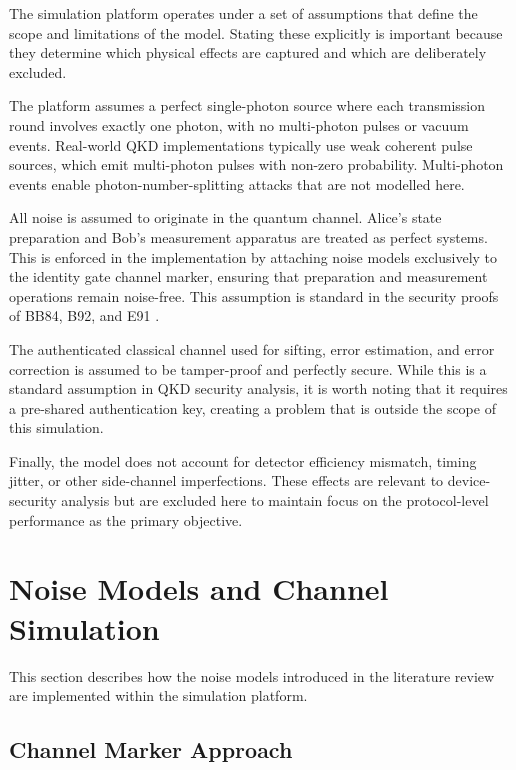 The simulation platform operates under a set of assumptions that define the scope and limitations of the model. Stating these explicitly is important because they determine which physical effects are captured and which are deliberately excluded.

The platform assumes a perfect single-photon source where each transmission round involves exactly one photon, with no multi-photon pulses or vacuum events. Real-world QKD implementations typically use weak coherent pulse sources, which emit multi-photon pulses with non-zero probability. Multi-photon events enable photon-number-splitting attacks that are not modelled here.

All noise is assumed to originate in the quantum channel. Alice's state preparation and Bob's measurement apparatus are treated as perfect systems. This is enforced in the implementation by attaching noise models exclusively to the identity gate channel marker, ensuring that preparation and measurement operations remain noise-free. This assumption is standard in the security proofs of BB84, B92, and E91 \cite{ShorPreskill2000, Scarani2009}.

The authenticated classical channel used for sifting, error estimation, and error correction is assumed to be tamper-proof and perfectly secure. While this is a standard assumption in QKD security analysis, it is worth noting that it requires a pre-shared authentication key, creating a problem that is outside the scope of this simulation.

Finally, the model does not account for detector efficiency mismatch, timing jitter, or other side-channel imperfections. These effects are relevant to device-security analysis but are excluded here to maintain focus on the protocol-level performance as the primary objective.


\section{Noise Models and Channel Simulation}
\label{sec:noise-impl}

This section describes how the noise models introduced in the literature review are implemented within the simulation platform.

\subsection{Channel Marker Approach}

